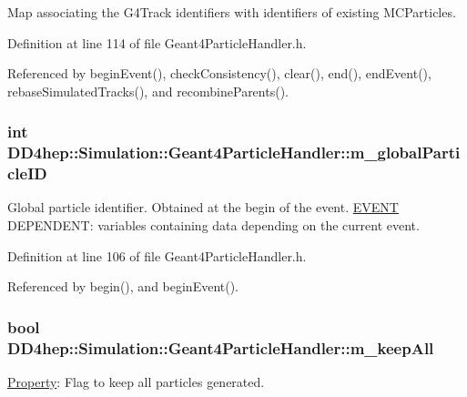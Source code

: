 Map associating the G4Track identifiers with identifiers of existing MCParticles. 

Definition at line 114 of file Geant4ParticleHandler.h.

Referenced by beginEvent(), checkConsistency(), clear(), end(), endEvent(), rebaseSimulatedTracks(), and recombineParents().\hypertarget{class_d_d4hep_1_1_simulation_1_1_geant4_particle_handler_a71f6aba6c3188b49fd16b63a3fff78a7}{
\subsubsection[{m\_\-globalParticleID}]{\setlength{\rightskip}{0pt plus 5cm}int {\bf DD4hep::Simulation::Geant4ParticleHandler::m\_\-globalParticleID}}}
\label{class_d_d4hep_1_1_simulation_1_1_geant4_particle_handler_a71f6aba6c3188b49fd16b63a3fff78a7}


Global particle identifier. Obtained at the begin of the event. \hyperlink{namespace_e_v_e_n_t}{EVENT} DEPENDENT: variables containing data depending on the current event. 

Definition at line 106 of file Geant4ParticleHandler.h.

Referenced by begin(), and beginEvent().\hypertarget{class_d_d4hep_1_1_simulation_1_1_geant4_particle_handler_ab2b6cb17640a8b5cc428b2142965a4e5}{
\subsubsection[{m\_\-keepAll}]{\setlength{\rightskip}{0pt plus 5cm}bool {\bf DD4hep::Simulation::Geant4ParticleHandler::m\_\-keepAll}}}
\label{class_d_d4hep_1_1_simulation_1_1_geant4_particle_handler_ab2b6cb17640a8b5cc428b2142965a4e5}


\hyperlink{class_d_d4hep_1_1_property}{Property}: Flag to keep all particles generated. 

